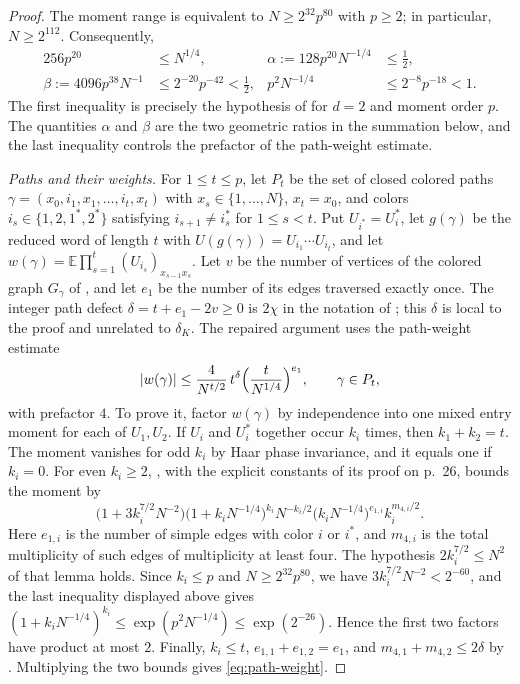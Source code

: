 \documentclass[11pt]{article}
\numberwithin{equation}{section}
\theoremstyle{boldremark}\newtheorem{remark}[theorem]{Remark}
\newcommand{\E}{\mathbb E}
\begin{document}
\begin{proof}
The moment range is equivalent to $N\ge2^{32}p^{80}$ with
$p\ge2$; in particular, $N\ge2^{112}$. Consequently,
\[
\begin{aligned}
 256p^{20}&\le N^{1/4},&
 \alpha:=128p^{20}N^{-1/4}&\le\tfrac12,\\
 \beta:=4096p^{38}N^{-1}&\le2^{-20}p^{-42}<\tfrac12,&
 p^2N^{-1/4}&\le2^{-8}p^{-18}<1.
\end{aligned}
\]
The first inequality is precisely the hypothesis of
\cite[Theorem~5.1]{BC} for $d=2$ and moment order $p$.
The quantities $\alpha$ and $\beta$ are the two geometric ratios in
the summation below, and the last inequality controls the prefactor
of the path-weight estimate.

\emph{Paths and their weights.}
For $1\le t\le p$, let $P_t$ be the set of closed colored paths
$\gamma=(x_0,i_1,x_1,\dots,i_t,x_t)$ with
$x_s\in\{1,\dots,N\}$, $x_t=x_0$, and colors
$i_s\in\{1,2,1^*,2^*\}$ satisfying $i_{s+1}\ne i_s^*$ for $1\le s<t$.
Put $U_{i^*}=U_i^*$, let $g(\gamma)$ be the reduced word of length $t$
with $U(g(\gamma))=U_{i_1}\cdots U_{i_t}$, and let
$w(\gamma)=\E\prod_{s=1}^{t}(U_{i_s})_{x_{s-1}x_s}$. Let $v$ be the number of vertices of the colored graph $G_\gamma$ of
\cite[Definition~5.2]{BC}, and let $e_1$ be the number of its edges
traversed exactly once. The integer path defect
$\delta=t+e_1-2v\ge0$ is $2\chi$ in the notation of \cite[equation~(26)]{BC}; this
$\delta$ is local to the proof and unrelated to $\delta_K$.
The repaired argument uses the path-weight estimate
\begin{equation}
 |w(\gamma)|\le\frac{4}{N^{t/2}}\,t^{\delta}
  \Bigl(\frac{t}{N^{1/4}}\Bigr)^{e_1},
 \qquad\gamma\in P_t,
 \label{eq:path-weight}
\end{equation}
with prefactor $4$. To prove it, factor $w(\gamma)$ by independence into one mixed entry
moment for each of $U_1,U_2$. If $U_i$ and $U_i^*$ together occur
$k_i$ times, then $k_1+k_2=t$. The moment vanishes for odd $k_i$ by
Haar phase invariance, and it equals one if $k_i=0$. For even
$k_i\ge2$, \cite[Lemma~5.4]{BC}, with the explicit constants of its
proof on p.~26, bounds the moment by
\[
 \bigl(1+3k_i^{7/2}N^{-2}\bigr)\bigl(1+k_iN^{-1/4}\bigr)^{k_i}
 N^{-k_i/2}\bigl(k_iN^{-1/4}\bigr)^{e_{1,i}}k_i^{m_{4,i}/2}.
\]
Here $e_{1,i}$ is the number of simple edges with color $i$ or $i^*$,
and $m_{4,i}$ is the total multiplicity of such edges of multiplicity
at least four. The hypothesis $2k_i^{7/2}\le N^2$ of that lemma
holds. Since $k_i\le p$ and $N\ge2^{32}p^{80}$, we have
$3k_i^{7/2}N^{-2}<2^{-60}$, and the last inequality displayed above
gives $(1+k_iN^{-1/4})^{k_i}\le\exp(p^2N^{-1/4})\le\exp(2^{-26})$.
Hence the first two factors have product at most $2$.
Finally, $k_i\le t$, $e_{1,1}+e_{1,2}=e_1$, and
$m_{4,1}+m_{4,2}\le2\delta$ by \cite[equation~(27)]{BC}.
Multiplying the two bounds gives \eqref{eq:path-weight}.


\end{proof}
\end{document}
